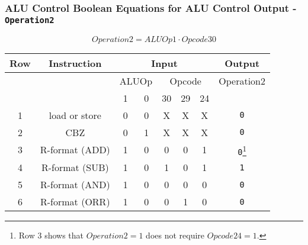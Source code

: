 \begin{frame}[fragile]\frametitle{ALU Control Boolean Equations for ALU Control Output - \texttt{Operation2}}

$$Operation2=ALUOp1 \cdot Opcode30$$
\begin{center}
\begin{tabular}{c|c|cc|ccc|c}
Row&Instruction   &  \multicolumn{5}{|c|}{Input} & \multicolumn{1}{|c}{Output}\\\hline
  &            & \multicolumn{2}{|c|}{ALUOp} &  \multicolumn{3}{|c|}{Opcode} & Operation2\\
& & 1 & 0 & 30 & 29 & 24 & \\\hline
1 &load or store & 0 & 0 &  X & X & X & \texttt{0}\\
2&CBZ           & 0 & 1 &  X & X & X & \texttt{0}\\
3&R-format (ADD)& 1 & 0 &  0 & 0 & 1 & \texttt{0}\footnote{Row 3 shows that $Operation2=1$ does not require $Opcode24=1$.}\\
4&R-format (SUB)& 1 & 0 &  1 & 0 & 1 & \texttt{1}\\
5&R-format (AND)& 1 & 0 &  0 & 0 & 0 & \texttt{0}\\
6&R-format (ORR)& 1 & 0 &  0 & 1 & 0 & \texttt{0}\\
\end{tabular}
\end{center}

\end{frame}

